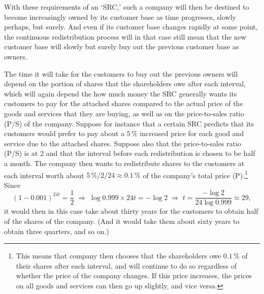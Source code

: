 \documentclass{article}
\begin{document}

With these requirements of an `SRC,' such a company will then be destined to become increasingly owned by its customer base as time progresses, slowly perhaps, but surely. And even if its customer base changes rapidly at some point, the continuous redistribution process will in that case still mean that the new customer base will slowly but surely buy out the previous customer base as owners. 

The time it will take for the customers to buy out the previous owners will depend on the portion of shares that the shareholders owe after each interval, which will again depend the how much money the SRC generally wants its customers to pay for the attached shares compared to the actual price of the goods and services that they are buying, as well as on the price-to-sales ratio (P/S) of the company. Suppose for instance that a certain SRC predicts that its customers would prefer to pay about a $5\, \%$ increased price for each good and service due to the attached shares. Suppose also that the price-to-sales ratio (P/S) is at 2 and that the interval before each redistribution is chosen to be half a month. The company then wants to redistribute shares to the customers at each interval worth about $5\, \% / 2 / 24 \approx 0.1\, \%$ of the company's total price (P).\footnote{
	This means that company then chooses that the shareholders owe $0.1\, \%$ of their shares after each interval, and will continue to do so regardless of whether the price of the company changes. 
	If this price increases, the prices on all goods and services can then go up slightly, and vice versa.
} 
Since
\[
	(1 - 0.001)^{24 t} = \frac{1}{2} 
	\;\Rightarrow\; 
	\log 0.999 \times 24 t = -\log 2 
	\;\Rightarrow\; 
	t = \frac{-\log 2}{24 \log 0.999} \approx 29,
\]
it would then in this case take about thirty years for the customers to obtain half of the shares of the company. (And it would take them about sixty years to obtain three quarters, and so on.)

\end{document}
